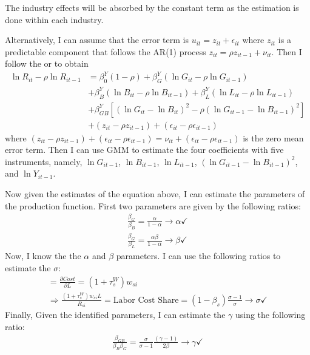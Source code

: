 The industry effects will be absorbed by the constant term as the estimation is done within each industry.  

Alternatively, I can assume that the error term is $u_{it} = z_{it} + \epsilon_{it}$ where $z_{it}$ is a predictable component that follows the AR(1) process $z_{it} = \rho z_{it-1} + \nu_{it}$. Then I follow the \cite{blundell2000gmm} or \cite{davis2014macroeconomic} to obtain
\begin{equation*}
  \begin{split}
    \ln R_{it} - \rho \ln R_{it-1} & = \beta_0^Y(1-\rho) + \beta_G^Y (\ln G_{it} - \rho \ln G_{it-1}) \\
    &  + \beta_B^Y (\ln B_{it} - \rho \ln B_{it-1}) + \beta_L^Y (\ln L_{it} - \rho \ln L_{it-1}) \\
    & + \beta_{GB}^Y [(\ln G_{it} -  \ln B_{it} )^2 - \rho(\ln G_{it-1} - \ln B_{it-1})^2]\\
    & + (z_{it} - \rho z_{it-1}) + (\epsilon_{it} - \rho \epsilon_{it-1})
  \end{split}
\end{equation*}
where $(z_{it} - \rho z_{it-1}) + (\epsilon_{it} - \rho \epsilon_{it-1}) = \nu_{it} + (\epsilon_{it} - \rho \epsilon_{it-1})$ is the zero mean error term. Then I can use GMM to estimate the four coefficients with five instruments, namely, $\ln G_{it-1}$, $\ln B_{it-1}$, $\ln L_{it-1}$, $(\ln G_{it-1} - \ln B_{it-1})^2$, and $\ln Y_{it-1}$.


Now given the estimates of the equation above, I can estimate the parameters of the production function.  First two parameters are given by the following ratios:
\begin{gather*}
    \frac{\beta_G}{\beta_B} = \frac{\alpha}{1-\alpha} \rightarrow \alpha \checkmark\\
    \frac{\beta_G}{\beta_L} = \frac{\alpha \beta}{1-\alpha} \rightarrow \beta \checkmark
\end{gather*}
Now, I know the the $\alpha$ and $\beta$ parameters. I can use the following ratios to estimate the $\sigma$:
\begin{equation*}
    \begin{split}
         = \frac{\partial Cost}{\partial L} = (1 + \tau^W_s)w_{si} \\
        \Rightarrow \frac{(1 + \tau^W_s)w_{si} L}{R_{si}} = \text{Labor Cost Share}= (1-\beta_s) \frac{\sigma-1}{\sigma} \rightarrow \sigma \checkmark
    \end{split}
\end{equation*}
Finally, Given the identified parameters, I can estimate the $\gamma$ using the following ratio:
\begin{gather*}
\frac{\beta_{GB}}{\beta_B\beta_G} = \frac{\sigma}{\sigma - 1}\frac{(\gamma-1)}{2\beta} \rightarrow \gamma \checkmark
\end{gather*}


